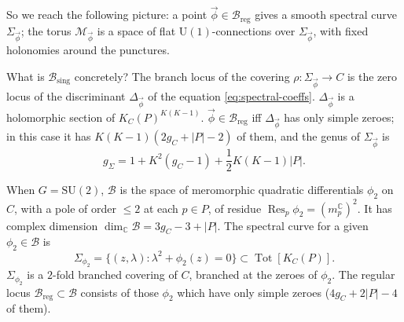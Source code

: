 \documentclass[12pt,letterpaper,reqno]{article}
\numberwithin{equation}{section}
\newcommand{\cB}{\ensuremath{\mathcal B}}
\newcommand{\cM}{\ensuremath{\mathcal M}}
\newcommand{\R}{\ensuremath{\mathbb R}}
\newcommand{\C}{\ensuremath{\mathbb C}}
\newcommand{\half}{\ensuremath{\frac{1}{2}}}
\newcommand{\I}{{\mathrm i}}
\newcommand{\sing}{\mathrm{sing}}
\newcommand{\reg}{\mathrm{reg}}
\newcommand{\abs}[1]{\lvert#1\rvert}
\newcommand{\vphi}{{\vec\phi}}
\newcommand{\ti}[1]{\textit{#1}}
\DeclareMathOperator{\Res}{Res}
\DeclareMathOperator{\Tot}{Tot}
\newcommand{\SU}{\mathrm{SU}}
\newcommand{\U}{\mathrm{U}}
\begin{document}
So we reach the following picture: a point $\vphi \in \cB_\reg$
gives a smooth spectral curve $\Sigma_\vphi$; the torus
$\cM_\vphi$ is a space of flat $\U(1)$-connections
over $\Sigma_\vphi$, with fixed holonomies around the
punctures.



\begin{remark}
What is $\cB_\sing$ concretely?
The branch locus of the covering $\rho: \Sigma_\vphi \to C$ 
is the zero locus of the discriminant $\Delta_{\vphi}$ of the equation \eqref{eq:spectral-coeffs}. $\Delta_\vphi$ 
is a holomorphic section of $K_C(P)^{K(K-1)}$.
$\vphi \in \cB_\reg$ iff $\Delta_\vphi$ has only simple zeroes; in this case
it has $K(K-1)(2g_C+\abs{P}-2)$ of them, and the genus of $\Sigma_\vphi$ is
\begin{equation}
g_\Sigma = 1 + K^2(g_C - 1) + \half K(K-1) \abs{P}.
\end{equation}
\end{remark}

\begin{example}[Hitchin base and spectral curves for $G = \SU(2)$]
When $G = \SU(2)$, $\cB$ is the space of meromorphic quadratic
differentials $\phi_2$ on $C$, with a pole of order $\le 2$ at 
each $p \in P$, of residue $\Res_p \phi_2 = (m_p^\C)^2$.
It has complex dimension
$\dim_\C \cB = 3 g_C - 3 + \abs{P}$. 
The spectral curve for a given $\phi_2 \in \cB$
is
\begin{equation}
  \Sigma_{\phi_2} = \{(z,\lambda): \lambda^2 + \phi_2(z) = 0\} \subset \Tot[K_C(P)].
\end{equation}
$\Sigma_{\phi_2}$ is a $2$-fold branched covering of $C$, branched at the zeroes of $\phi_2$.
The regular locus $\cB_\reg \subset \cB$ consists of those $\phi_2$ which have only simple zeroes ($4 g_C + 2\abs{P} - 4$ of them).
\end{example}
\end{document}
